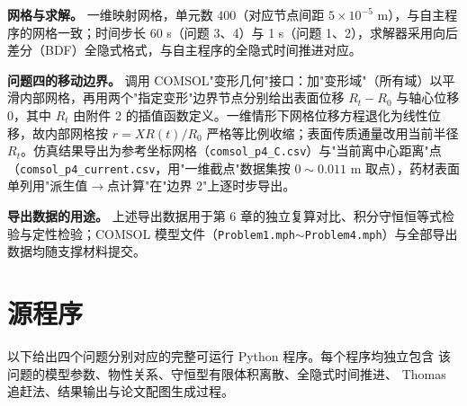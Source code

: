 \documentclass[12pt,a4paper]{article}
\begin{document}
\textbf{网格与求解。} 一维映射网格，单元数 400（对应节点间距 $5\times10^{-5}$ m），与自主程序的网格一致；时间步长 60 s（问题 3、4）与 1 s（问题 1、2），求解器采用向后差分（BDF）全隐式格式，与自主程序的全隐式时间推进对应。

\textbf{问题四的移动边界。} 调用 COMSOL"变形几何"接口：加"变形域"（所有域）以平滑内部网格，再用两个"指定变形"边界节点分别给出表面位移 $R_t-R_0$ 与轴心位移 $0$，其中 $R_t$ 由附件 2 的插值函数定义。一维情形下网格位移方程退化为线性位移，故内部网格按 $r=X R(t)/R_0$ 严格等比例收缩；表面传质通量改用当前半径 $R_t$。仿真结果导出为参考坐标网格（\texttt{comsol\_p4\_C.csv}）与"当前离中心距离"点（\texttt{comsol\_p4\_current.csv}，用"一维截点"数据集按 $0\sim0.011$ m 取点），药材表面单列用"派生值$\rightarrow$点计算"在"边界 2"上逐时步导出。

\textbf{导出数据的用途。} 上述导出数据用于第 6 章的独立复算对比、积分守恒恒等式检验与定性检验；COMSOL 模型文件（\texttt{Problem1.mph}$\sim$\texttt{Problem4.mph}）与全部导出数据均随支撑材料提交。

\section{源程序}

以下给出四个问题分别对应的完整可运行 Python 程序。每个程序均独立包含
该问题的模型参数、物性关系、守恒型有限体积离散、全隐式时间推进、
Thomas 追赶法、结果输出与论文配图生成过程。








\end{document}
